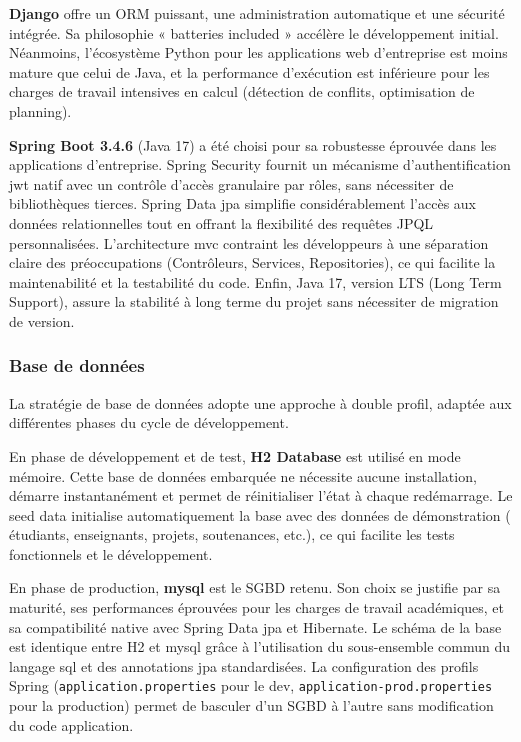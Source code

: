 \textbf{Django} offre un ORM puissant, une administration automatique et une sécurité intégrée. Sa philosophie « batteries included » accélère le développement initial. Néanmoins, l'écosystème Python pour les applications web d'entreprise est moins mature que celui de Java, et la performance d'exécution est inférieure pour les charges de travail intensives en calcul (détection de conflits, optimisation de planning).

\textbf{Spring Boot 3.4.6} (Java 17) a été choisi pour sa robustesse éprouvée dans les applications d'entreprise. Spring Security fournit un mécanisme d'authentification \acrshort{jwt} natif avec un contrôle d'accès granulaire par rôles, sans nécessiter de bibliothèques tierces. Spring Data \gls{jpa} simplifie considérablement l'accès aux données relationnelles tout en offrant la flexibilité des requêtes JPQL personnalisées. L'architecture \gls{mvc} contraint les développeurs à une séparation claire des préoccupations (Contrôleurs, Services, Repositories), ce qui facilite la maintenabilité et la testabilité du code. Enfin, Java 17, version LTS (Long Term Support), assure la stabilité à long terme du projet sans nécessiter de migration de version.

\subsubsection{Base de données}
\label{ch2:base_donnees}

La stratégie de base de données adopte une approche à double profil, adaptée aux différentes phases du cycle de développement.

En phase de développement et de test, \textbf{H2 Database} est utilisé en mode mémoire. Cette base de données embarquée ne nécessite aucune installation, démarre instantanément et permet de réinitialiser l'état à chaque redémarrage. Le seed data initialise automatiquement la base avec des données de démonstration ( étudiants,  enseignants,  projets,  soutenances, etc.), ce qui facilite les tests fonctionnels et le développement.

En phase de production, \textbf{\acrshort{mysql}} est le SGBD retenu. Son choix se justifie par sa maturité, ses performances éprouvées pour les charges de travail académiques, et sa compatibilité native avec Spring Data \acrshort{jpa} et Hibernate. Le schéma de la base est identique entre H2 et \acrshort{mysql} grâce à l'utilisation du sous-ensemble commun du langage \gls{sql} et des annotations \acrshort{jpa} standardisées. La configuration des profils Spring (\texttt{application.properties} pour le dev, \texttt{application-prod.properties} pour la production) permet de basculer d'un SGBD à l'autre sans modification du code application.

